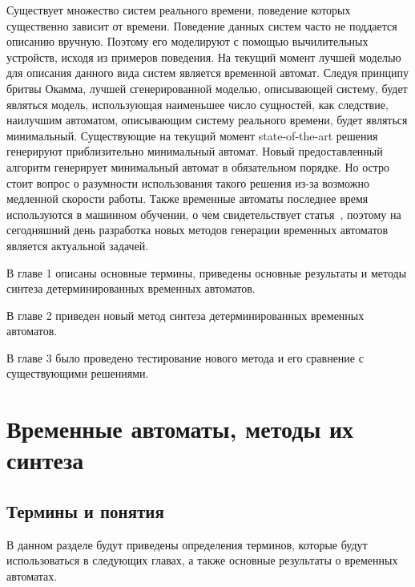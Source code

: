 \documentclass[times,specification,annotation]{itmo-student-thesis}
\begin{document}


\tableofcontents

\startprefacepage

Существует множество систем реального времени, поведение которых существенно зависит от времени. Поведение данных систем часто не поддается описанию вручную. Поэтому его
моделируют с помощью вычилительных устройств, исходя из примеров поведения. На текущий момент лучшей моделью для описания данного вида систем является временной автомат.
Следуя принципу бритвы Окамма, лучшей сгенерированной моделью, описывающей систему, будет являться модель, использующая наименьшее число сущностей, как следствие,
наилучшим автоматом, описывающим систему реального времени, будет являться минимальный. Существующие на текущий момент state-of-the-art решения генерируют приблизительно минимальный
автомат. Новый предоставленный алгоритм генерирует минимальный автомат в обязательном порядке. Но остро стоит вопрос о разумности использования такого решения из-за
возможно медленной скорости работы. Также временные автоматы последнее время используются в машинном обучении, о чем свидетельствует статья~\cite{moha}, поэтому на сегодняшний день
разработка новых методов генерации временных автоматов является актуальной задачей. 

В главе 1 описаны основные термины, приведены основные результаты и методы синтеза детерминированных временных автоматов.

В главе 2 приведен новый метод синтеза детерминированных временных автоматов.

В главе 3 было проведено тестирование нового метода и его сравнение с существующими решениями.

\chapter{Временные автоматы, методы их синтеза}

\section{Термины и понятия}
В данном разделе будут приведены определения терминов, которые будут использоваться в следующих главах, а также основные результаты о временных автоматах.
\end{document}
